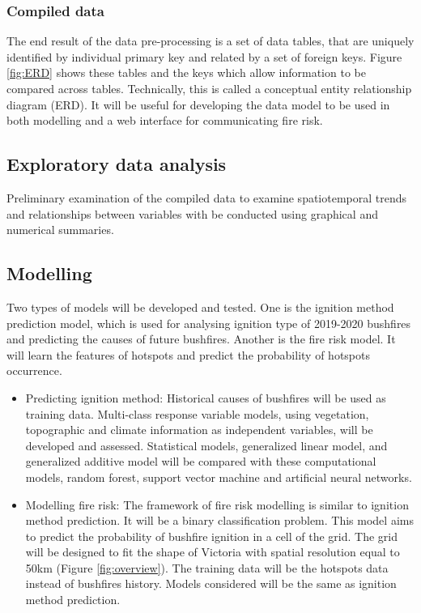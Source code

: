 \documentclass[11pt,a4paper,]{article}
\begin{document}
\hypertarget{compiled-data}{%
\subsubsection{Compiled data}\label{compiled-data}}

The end result of the data pre-processing is a set of data tables, that are uniquely identified by individual primary key and related by a set of foreign keys. Figure \ref{fig:ERD} shows these tables and the keys which allow information to be compared across tables. Technically, this is called a conceptual entity relationship diagram (ERD). It will be useful for developing the data model to be used in both modelling and a web interface for communicating fire risk.

\hypertarget{exploratory-data-analysis}{%
\subsection{Exploratory data analysis}\label{exploratory-data-analysis}}

Preliminary examination of the compiled data to examine spatiotemporal trends and relationships between variables with be conducted using graphical and numerical summaries.

\hypertarget{modelling}{%
\subsection{Modelling}\label{modelling}}

Two types of models will be developed and tested. One is the ignition method prediction model, which is used for analysing ignition type of 2019-2020 bushfires and predicting the causes of future bushfires. Another is the fire risk model. It will learn the features of hotspots and predict the probability of hotspots occurrence.

\begin{itemize}
\item
  Predicting ignition method: Historical causes of bushfires will be used as training data. Multi-class response variable models, using vegetation, topographic and climate information as independent variables, will be developed and assessed. Statistical models, generalized linear model, and generalized additive model will be compared with these computational models, random forest, support vector machine and artificial neural networks.
\item
  Modelling fire risk: The framework of fire risk modelling is similar to ignition method prediction. It will be a binary classification problem. This model aims to predict the probability of bushfire ignition in a cell of the grid. The grid will be designed to fit the shape of Victoria with spatial resolution equal to 50km (Figure \ref{fig:overview}). The training data will be the hotspots data instead of bushfires history. Models considered will be the same as ignition method prediction.
\end{itemize}
\end{document}
